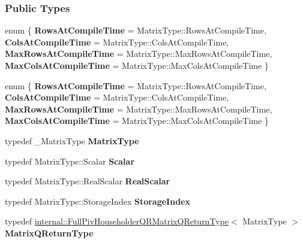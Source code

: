 \subsubsection*{Public Types}
\begin{DoxyCompactItemize}
\item 
\mbox{\label{group___q_r___module_a1ab2e884134a6b4a66bdfca9a11f0cb3}} 
enum \{ {\bfseries Rows\+At\+Compile\+Time} = Matrix\+Type\+:\+:Rows\+At\+Compile\+Time, 
{\bfseries Cols\+At\+Compile\+Time} = Matrix\+Type\+:\+:Cols\+At\+Compile\+Time, 
{\bfseries Max\+Rows\+At\+Compile\+Time} = Matrix\+Type\+:\+:Max\+Rows\+At\+Compile\+Time, 
{\bfseries Max\+Cols\+At\+Compile\+Time} = Matrix\+Type\+:\+:Max\+Cols\+At\+Compile\+Time
 \}
\item 
\mbox{\label{group___q_r___module_af618b3a3cbcc5df8a005b690c4715080}} 
enum \{ {\bfseries Rows\+At\+Compile\+Time} = Matrix\+Type\+:\+:Rows\+At\+Compile\+Time, 
{\bfseries Cols\+At\+Compile\+Time} = Matrix\+Type\+:\+:Cols\+At\+Compile\+Time, 
{\bfseries Max\+Rows\+At\+Compile\+Time} = Matrix\+Type\+:\+:Max\+Rows\+At\+Compile\+Time, 
{\bfseries Max\+Cols\+At\+Compile\+Time} = Matrix\+Type\+:\+:Max\+Cols\+At\+Compile\+Time
 \}
\item 
\mbox{\label{group___q_r___module_aad34d3573bf47e18888d1bb4801e7473}} 
typedef \+\_\+\+Matrix\+Type {\bfseries Matrix\+Type}
\item 
\mbox{\label{group___q_r___module_a30eb2e756bcd1c1148142a3a0deb6f88}} 
typedef Matrix\+Type\+::\+Scalar {\bfseries Scalar}
\item 
\mbox{\label{group___q_r___module_a22c6a854a83225617e56c03cbdbc94c3}} 
typedef Matrix\+Type\+::\+Real\+Scalar {\bfseries Real\+Scalar}
\item 
\mbox{\label{group___q_r___module_a55934e8ed065b629ca86382863fc66b0}} 
typedef Matrix\+Type\+::\+Storage\+Index {\bfseries Storage\+Index}
\item 
\mbox{\label{group___q_r___module_aca49f0aada2187c4b37b59211188a267}} 
typedef \hyperlink{group___q_r___module_struct_eigen_1_1internal_1_1_full_piv_householder_q_r_matrix_q_return_type}{internal\+::\+Full\+Piv\+Householder\+Q\+R\+Matrix\+Q\+Return\+Type}$<$ Matrix\+Type $>$ {\bfseries Matrix\+Q\+Return\+Type}

\end{DoxyCompactItemize}
